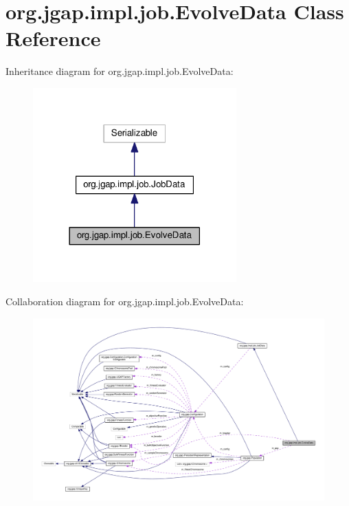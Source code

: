 \hypertarget{classorg_1_1jgap_1_1impl_1_1job_1_1_evolve_data}{\section{org.\-jgap.\-impl.\-job.\-Evolve\-Data Class Reference}
\label{classorg_1_1jgap_1_1impl_1_1job_1_1_evolve_data}
}


Inheritance diagram for org.\-jgap.\-impl.\-job.\-Evolve\-Data\-:
\nopagebreak
\begin{figure}[H]
\begin{center}
\leavevmode
\includegraphics[width=222pt]{classorg_1_1jgap_1_1impl_1_1job_1_1_evolve_data__inherit__graph}
\end{center}
\end{figure}


Collaboration diagram for org.\-jgap.\-impl.\-job.\-Evolve\-Data\-:
\nopagebreak
\begin{figure}[H]
\begin{center}
\leavevmode
\includegraphics[width=350pt]{classorg_1_1jgap_1_1impl_1_1job_1_1_evolve_data__coll__graph}
\end{center}
\end{figure}
